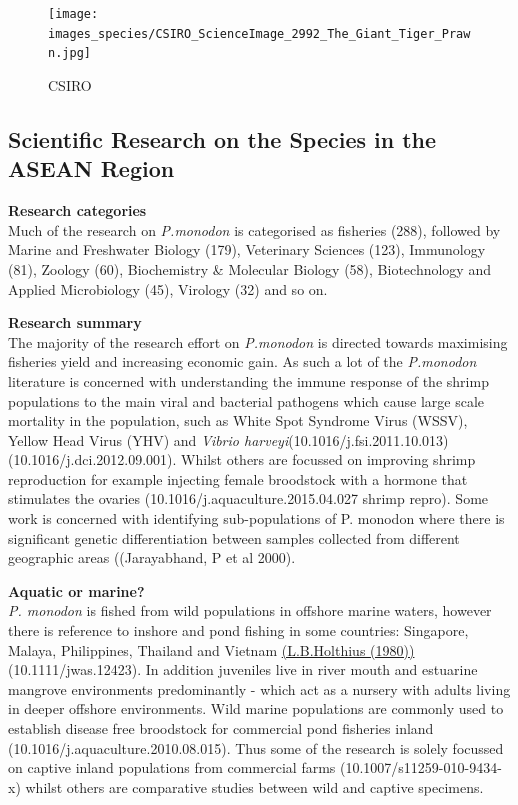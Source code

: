 \documentclass[]{book}
\theoremstyle{definition}
\theoremstyle{definition}
\theoremstyle{definition}
\theoremstyle{remark}
\begin{document}
\begin{figure}
\centering
\texttt{[image: images\_species/CSIRO\_ScienceImage\_2992\_The\_Giant\_Tiger\_Prawn.jpg]}
\caption{CSIRO}
\end{figure}

\hypertarget{scientific-research-on-the-species-in-the-asean-region-3}{%
\subsection{Scientific Research on the Species in the ASEAN
Region}\label{scientific-research-on-the-species-in-the-asean-region-3}}

\textbf{Research categories}\\
Much of the research on \emph{P.monodon} is categorised as fisheries
(288), followed by Marine and Freshwater Biology (179), Veterinary
Sciences (123), Immunology (81), Zoology (60), Biochemistry \& Molecular
Biology (58), Biotechnology and Applied Microbiology (45), Virology (32)
and so on.

\textbf{Research summary}\\
The majority of the research effort on \emph{P.monodon} is directed
towards maximising fisheries yield and increasing economic gain. As such
a lot of the \emph{P.monodon} literature is concerned with understanding
the immune response of the shrimp populations to the main viral and
bacterial pathogens which cause large scale mortality in the population,
such as White Spot Syndrome Virus (WSSV), Yellow Head Virus (YHV) and
\emph{Vibrio harveyi}(10.1016/j.fsi.2011.10.013)
(10.1016/j.dci.2012.09.001). Whilst others are focussed on improving
shrimp reproduction for example injecting female broodstock with a
hormone that stimulates the ovaries (10.1016/j.aquaculture.2015.04.027
shrimp repro). Some work is concerned with identifying sub-populations
of P. monodon where there is significant genetic differentiation between
samples collected from different geographic areas ((Jarayabhand, P et al
2000).

\textbf{Aquatic or marine?}\\
\emph{P. monodon} is fished from wild populations in offshore marine
waters, however there is reference to inshore and pond fishing in some
countries: Singapore, Malaya, Philippines, Thailand and Vietnam
\href{http://www.fao.org/fishery/species/3405/en}{(L.B.Holthius (1980))}
(10.1111/jwas.12423). In addition juveniles live in river mouth and
estuarine mangrove environments predominantly - which act as a nursery
with adults living in deeper offshore environments. Wild marine
populations are commonly used to establish disease free broodstock for
commercial pond fisheries inland (10.1016/j.aquaculture.2010.08.015).
Thus some of the research is solely focussed on captive inland
populations from commercial farms (10.1007/s11259-010-9434-x) whilst
others are comparative studies between wild and captive specimens.
\end{document}
